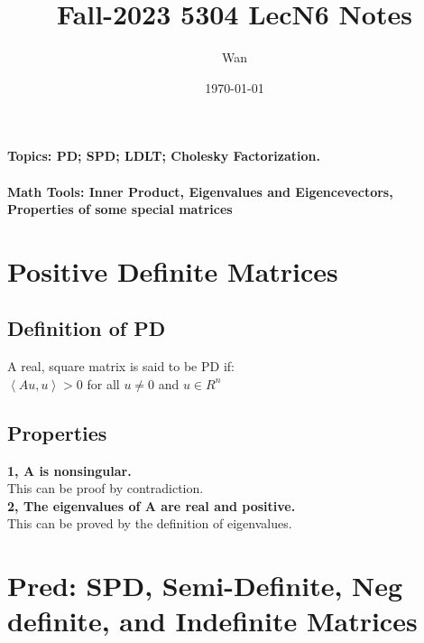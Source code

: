 \documentclass{article}
\begin{document}
\title{Fall-2023 5304 LecN6 Notes}
\author{Wan}
\date{\today}
\maketitle

\noindent
\textbf{Topics: PD; SPD; LDLT; Cholesky Factorization.}\\
\\
\textbf{Math Tools: Inner Product, Eigenvalues and Eigencevectors, Properties of some special matrices}

\section{Positive Definite Matrices}


\subsection*{Definition of PD}
A real, square matrix is said to be PD if:\\
$\left\langle Au,u\right\rangle > 0$ for all $u \neq 0$ and $u \in R^n$

\subsection{Properties}
\textbf{1, A is nonsingular.}\\
This can be proof by contradiction.\\

\noindent
\textbf{2, The eigenvalues of A are real and positive.}\\
This can be proved by the definition of eigenvalues.\\

\pagebreak
\section{Pred: SPD, Semi-Definite, Neg definite, and Indefinite Matrices}
\end{document}
